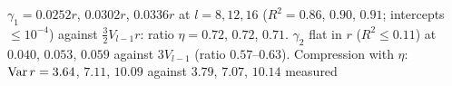 $\gamma_1=0.0252r$, $0.0302r$, $0.0336r$ at $l=8,12,16$ ($R^2=0.86$, $0.90$, $0.91$; intercepts $\le10^{-4}$) against $\frac32V_{l-1}r$: ratio $\eta=0.72$, $0.72$, $0.71$.
$\gamma_2$ flat in $r$ ($R^2\le0.11$) at $0.040$, $0.053$, $0.059$ against $3V_{l-1}$ (ratio $0.57$--$0.63$). Compression with $\eta$: $\operatorname{Var} r=3.64$, $7.11$, $10.09$ against
$3.79$, $7.07$, $10.14$ measured
